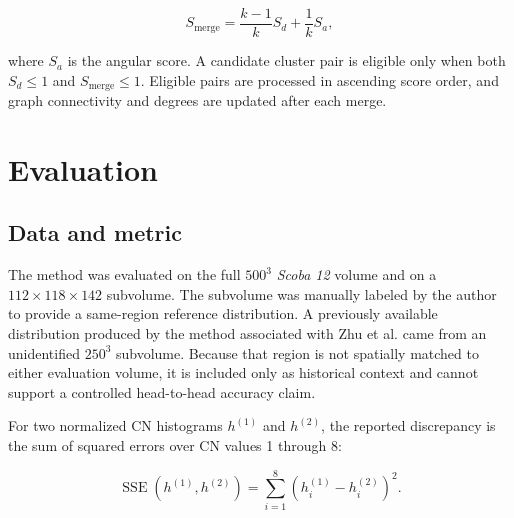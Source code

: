 \documentclass[11pt,letterpaper]{article}
\newcommand{\dataset}{\textit{Scoba 12}}
\begin{document}
\begin{equation}
    S_{\mathrm{merge}}=\frac{k-1}{k}S_d+\frac{1}{k}S_a,
    \label{eq:merge-score}
\end{equation}

where $S_a$ is the angular score. A candidate cluster pair is eligible only when both $S_d\leq1$ and $S_{\mathrm{merge}}\leq1$. Eligible pairs are processed in ascending score order, and graph connectivity and degrees are updated after each merge.

\begin{algorithm}[htbp]
\caption{Merge touching junctions}
\end{algorithm}

\section{Evaluation}

\subsection{Data and metric}

The method was evaluated on the full $500^3$ \dataset{} volume and on a $112\times118\times142$ subvolume. The subvolume was manually labeled by the author to provide a same-region reference distribution. A previously available distribution produced by the method associated with Zhu et al. \cite{sotamethod} came from an unidentified $250^3$ subvolume. Because that region is not spatially matched to either evaluation volume, it is included only as historical context and cannot support a controlled head-to-head accuracy claim.

For two normalized CN histograms $h^{(1)}$ and $h^{(2)}$, the reported discrepancy is the sum of squared errors over CN values 1 through 8:

\begin{equation}
    \operatorname{SSE}\!\left(h^{(1)},h^{(2)}\right)
    =\sum_{i=1}^{8}\left(h_i^{(1)}-h_i^{(2)}\right)^2.
    \label{eq:sse}
\end{equation}
\end{document}
